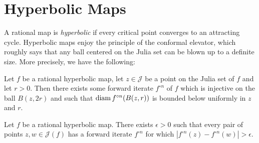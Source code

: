 \begin{comment}
\begin{proof}
Formally, $\overline{\psi}(\overline{z})$
	is another conformal conjugacy between $f$ and $f_0$ which fixes infinity, so by uniqueness of the Böttcher coordinate we obtain $\psi(z)=\overline{\psi}(\overline{z})$,
	hence $\psi(z)\in\R$ for $z\in\R$.
\end{proof}
\end{comment}

\section{Hyperbolic Maps}

A rational map is \emph{hyperbolic} if every critical point converges to an attracting cycle.
Hyperbolic maps enjoy the principle of the conformal elevator, which roughly says that any ball centered on the Julia set can be blown up to a definite size. More precisely, we have the following:

\begin{proposition} \label{elevator}
	Let $f$ be a rational hyperbolic map, let $z\in \mathcal J$ be a point on the Julia set of $f$ and let $r>0$. Then there exists some forward iterate $f^{\circ n}$ of $f$ which is injective on the ball $B(z,2r)$ and such that
	$\operatorname{diam} {f^{\circ n}(B(z,r))}$ is bounded below uniformly in $z$ and $r$. 
\end{proposition}


\begin{corollary} \label{elevator for points on julia}
	Let $f$ be a rational hyperbolic map. There exists  $\epsilon > 0$ such that every pair of points $z,w\in\mathcal{J}(f)$ has a forward iterate $f^{\circ n}$ for which $\left|f^{\circ n}(z)-f^{\circ n}(w)\right|>\epsilon$.	
\end{corollary}

\begin{comment}
\begin{proof}
	Apply \cref{elevator} to a ball centered on the Julia set which contains $z,w$ on its boundary at roughly antipodal points. After blowing up we get points $f^{\circ n}(z),f^{\circ n}(w)$ which are a definite distance apart by Koebe's distortion theorem. %
\end{proof}
\end{comment}

